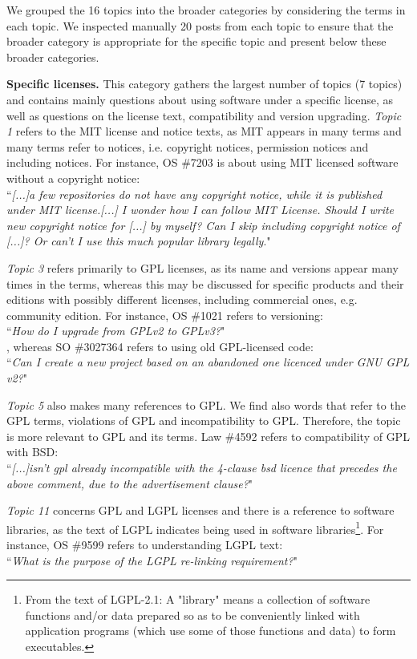 \documentclass{elsarticle}
\begin{document}


We grouped the 16 topics into the broader categories by considering the terms in each topic. We inspected manually 20 posts from each topic to ensure that the broader category is appropriate for the specific topic and present below these broader categories.

\textbf{Specific licenses.} This category gathers the largest number of topics (7 topics) and contains mainly questions about using software under a specific license, as well as questions on the license text, compatibility and version upgrading. \emph{Topic 1} refers to the MIT license and notice texts, as MIT appears in many terms and many terms refer to notices, i.e. copyright notices, permission notices and including notices. For instance, OS \#7203 is about using MIT licensed software without a copyright notice:\\
``\emph{[...]a few repositories do not have any copyright notice, while it is published under MIT license.[...] I wonder how I can follow MIT License. Should I write new copyright notice for [...] by myself? Can I skip including copyright notice of [...]? Or can’t I use this much popular library legally}."

\emph{Topic 3} refers primarily to GPL licenses, as its name and versions appear many times in the terms, whereas this may be discussed for specific products and their editions with possibly different licenses, including commercial ones, e.g. community edition. For instance, OS \#1021 refers to versioning:\\  
``\emph{How do I upgrade from GPLv2 to GPLv3?}"\\
, whereas SO \#3027364 refers to using old GPL-licensed code:\\
``\emph{Can I create a new project based on an abandoned one licenced under GNU GPL v2?}"

\emph{Topic 5} also makes many references to GPL. We find also words that refer to the GPL terms, violations of GPL and incompatibility to GPL. Therefore, the topic is more relevant to GPL and its terms. Law \#4592 refers to compatibility of GPL with BSD:\\
``\emph{[...]isn't gpl already incompatible with the 4-clause bsd licence that precedes the above comment, due to the advertisement clause?}"

\emph{Topic 11} concerns GPL and LGPL licenses and there is a reference to software libraries, as the text of LGPL indicates being used in software libraries\footnote{From the text of LGPL-2.1: A "library" means a collection of software functions and/or data prepared so as to be conveniently linked with application programs (which use some of those functions and data) to form executables.}. For instance, OS \#9599 refers to understanding LGPL text:\\
``\emph{What is the purpose of the LGPL re-linking requirement?}"
\end{document}
